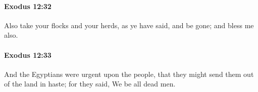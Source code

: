 		\paragraph{Exodus 12:32} %
			\label{EXODUS-12-32}

			Also take your flocks and your herds, as ye have said, and be gone; and bless me also.


		\paragraph{Exodus 12:33} %
			\label{EXODUS-12-33}

			And the Egyptians were urgent upon the people, that they might send them out of the land in haste; for they said, We be all dead men.


